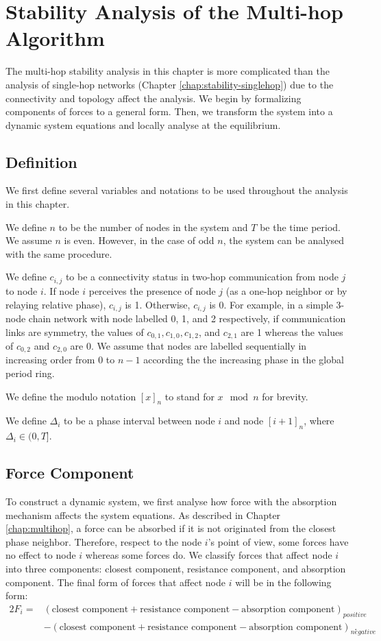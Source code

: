 \chapter{Stability Analysis of the Multi-hop Algorithm}
\label{chap:stability-multihop}

The multi-hop stability analysis in this chapter is more complicated than the analysis of single-hop networks (Chapter \ref{chap:stability-singlehop}) due to the connectivity and topology affect the analysis.
We begin by formalizing components of forces to a general form. Then, we transform the system into a dynamic system equations and locally analyse at the equilibrium.

\section{Definition}
We first define several variables and notations to be used throughout the analysis in this chapter.

We define $n$ to be the number of nodes in the system and $T$ be the time period. We assume $n$ is even. However, in the case of odd $n$, the system can be analysed with the same procedure.

We define $c_{i,j}$ to be a connectivity status in two-hop communication from node $j$ to node $i$.
If node $i$ perceives the presence of node $j$ (as a one-hop neighbor or by relaying relative phase), $c_{i,j}$ is 1. Otherwise, $c_{i,j}$ is 0. For example, in a simple 3-node chain network with node labelled 0, 1, and 2 respectively, if communication links are symmetry, the values of $c_{0,1}, c_{1,0}, c_{1,2}$, and $c_{2,1}$ are 1 whereas the values of $c_{0,2}$ and $c_{2,0}$ are 0. We assume that nodes are labelled sequentially in increasing order from $0$ to $n-1$ according the the increasing phase in the global period ring.

We define the modulo notation $[x]_n$ to stand for $x \mod n$ for brevity.

We define $\Delta_i$ to be a phase interval between node $i$ and node $[i+1]_n$, where $\Delta_i \in (0, T]$.


\section{Force Component}
To construct a dynamic system, we first analyse how force with the absorption mechanism affects the system equations.
As described in Chapter \ref{chap:multihop}, a force can be absorbed if it is not originated from the closest phase neighbor. Therefore, respect to the node $i$'s point of view, some forces have no effect to node $i$ whereas some forces do. 
We classify forces that affect node $i$ into three components: closest component, resistance component, and absorption component.
The final form of forces that affect node $i$ will be in the following form:
\begin{alignat}{2}
F_{i} =& (\text{closest component} + \text{resistance component} - \text{absorption component})_{positive} \nonumber \\
 &- (\text{closest component} + \text{resistance component} - \text{absorption component})_{negative}.
\end{alignat}

